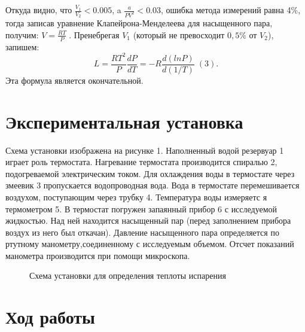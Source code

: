 \documentclass[a4paper,11.5pt]{article} %
\begin{document}
Откуда видно, что $\frac{V_1}{V_2} < 0.005$, a $\frac{a}{PV^2}<0.03$, ошибка метода измерений равна 4\%, тогда записав уравнение Клапейрона-Менделеева для насыщенного пара, получим:
$V=\frac{RT}{P}\;.$
Пренебрегая $V_1$ (который не превосходит $0,5\%$ от $V_2$), запишем:
$$L=\frac{RT^2}{P} \frac{dP}{dT} = -R\frac{d(lnP)}{d(1/T)}\;(3).$$
Эта формула является окончательной.

\section{Экспериментальная установка}

Схема установки изображена на рисунке 1. Наполненный водой резервуар 1 играет роль термостата. Нагревание термостата производится спиралью 2, подогреваемой электрическим током. Для охлаждения воды в термостате через змеевик 3 пропускается водопроводная вода. Вода в термостате перемешивается воздухом,
поступающим через трубку 4. Температура воды измеряетс
я термометром 5. В термостат погружен запаянный прибор 6 с исследуемой жидкостью. Над ней находится насыщенный пар (перед заполнением прибора воздух из него был откачан).
Давление насыщенного пара определяется по ртутному манометру,соединенному с исследуемым объемом. Отсчет показаний манометра производится при помощи микроскопа.


\begin{figure}[h]
	\caption{Схема установки для определения теплоты испарения}
\end{figure}

\section{Ход работы}
\end{document}
